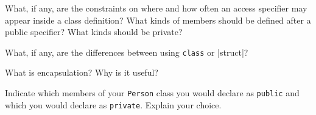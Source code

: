 %
%
\begin{question}
What, if any, are the constraints on where and how often an
access specifier may appear inside a class definition? What kinds of members
should be defined after a public specifier? What kinds should be private?
\end{question}

\begin{question}
What, if any, are the differences between using \verb|class| or |struct|?
\end{question}

\begin{question}
What is encapsulation? Why is it useful?
\end{question}

\begin{question}
Indicate which members of your \verb|Person| class you would
declare as \verb|public| and which you would declare as \verb|private|. Explain your
choice.
\end{question}
